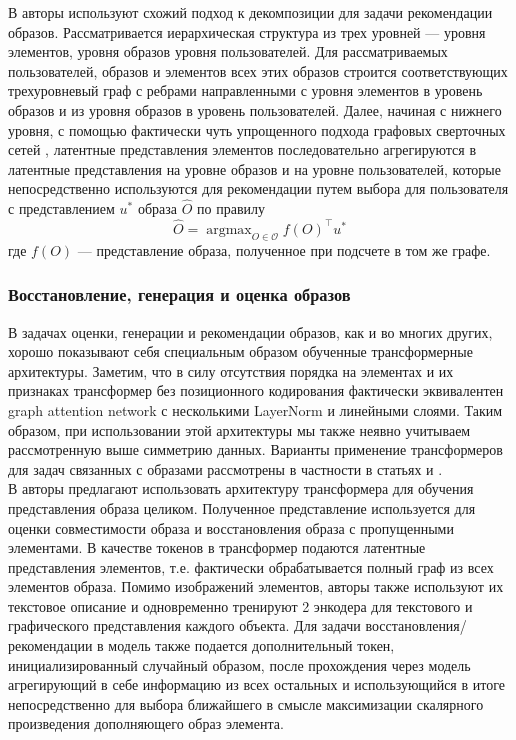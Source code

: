 \documentclass[a4paper,12pt]{article}
\DeclareMathOperator*{\argmax}{argmax}
\begin{document}
				В \cite{https://doi.org/10.48550/arXiv.2005.12566} авторы используют схожий подход к декомпозиции для задачи рекомендации образов. Рассматривается иерархическая структура из трех уровней --- уровня элементов, уровня образов уровня пользователей. Для рассматриваемых пользователей, образов и элементов всех этих образов строится соответствующих трехуровневый граф с ребрами направленными с уровня элементов в уровень образов и из уровня образов в уровень пользователей. Далее, начиная с нижнего уровня, с помощью фактически чуть упрощенного подхода графовых сверточных сетей \cite{https://doi.org/10.48550/arXiv.1609.02907}, латентные представления элементов последовательно агрегируются в латентные представления на уровне образов и на уровне пользователей, которые непосредственно используются для рекомендации путем выбора для пользователя с представлением $u^*$ образа $\hat{O}$ по правилу $$\hat{O} = \argmax_{O\in \mathcal{O}}f(O)^\intercal u^*$$
				где $f(O)$ --- представление образа, полученное при подсчете в том же графе.
				
			\subsubsection{Восстановление, генерация и оценка образов}
				В задачах оценки, генерации и рекомендации образов, как и во многих других, хорошо показывают себя специальным образом обученные трансформерные \cite{https://doi.org/10.48550/arXiv.1706.03762} архитектуры. Заметим, что в силу отсутствия порядка на элементах и их признаках трансформер без позиционного кодирования \cite{https://doi.org/10.48550/arXiv.1706.03762} фактически эквивалентен graph attention network \cite{
				https://doi.org/10.48550/arXiv.1710.10903} с несколькими LayerNorm \cite{
				https://doi.org/10.48550/arXiv.1607.06450} и линейными слоями. Таким образом, при использовании этой архитектуры мы также неявно учитываем рассмотренную выше симметрию данных. 
				Варианты применение трансформеров для задач связанных с образами рассмотрены в частности в статьях \cite{https://doi.org/10.48550/arXiv.2303.02483} и \cite{https://doi.org/10.48550/arXiv.2204.04812}.\\
				
				В \cite{https://doi.org/10.48550/arXiv.2204.04812} авторы предлагают использовать архитектуру трансформера для обучения представления образа целиком. Полученное представление используется для оценки совместимости образа и восстановления образа с пропущенными элементами. В качестве токенов в трансформер подаются латентные представления элементов, т.е. фактически обрабатывается полный граф из всех элементов образа. Помимо изображений элементов, авторы также используют их текстовое описание и одновременно тренируют 2 энкодера для текстового и графического представления каждого объекта. Для задачи восстановления/рекомендации в модель также подается дополнительный токен, инициализированный случайный образом, после прохождения через модель агрегирующий в себе информацию из всех остальных и использующийся в итоге непосредственно для выбора ближайшего в смысле максимизации скалярного произведения дополняющего образ элемента.
				
\end{document}
